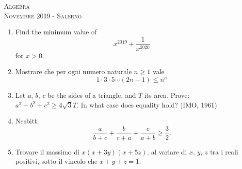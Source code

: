 \documentclass[a4paper]{article}
\theoremstyle{remark}
\theoremstyle{definition}
\begin{document}
\newpage
\begin{center}
	\vspace*{0,5 cm}
	{\Huge \textsc{Algebra}} \\
	\vspace{0,5 cm}
	\textsc{Novembre 2019 - Salerno}
	\thispagestyle{empty}
	\vspace{0,7 cm}
\end{center}
\normalsize

\begin{enumerate}
	\item Find the minimum value of
	\[ x^{2019} + \frac{1}{x^{2020}} \]
	for $ x > 0 $.
	
	\item Mostrare che per ogni numero naturale $ n \geq 1 $ vale
	\[ 1 \cdot 3 \cdot 5 \cdots (2n-1) \leq n^n \]
	
	\item Let $ a $, $ b $, $ c $ be the sides of a triangle, and $ T $ its area. Prove: $ a^2+b^2+c^2 \geq 4\sqrt{3}T $. In what case does
	equality hold? (IMO, 1961)
	
	\item Nesbitt.
	\[ \frac{a}{b+c} + \frac{b}{c+a} + \frac{c}{a + b} \geq \frac{3}{2}. \]
	
	\item Trovare il massimo di $ x(x + 3y)(x + 5z) $, al variare di $ x, \, y, \, z $ tra i reali positivi, sotto il vincolo che $ x + y +z = 1 $.
	
\end{enumerate}
\end{document}
